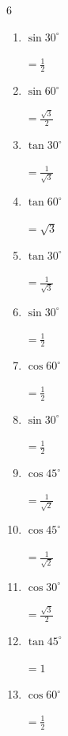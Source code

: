 \begin{multicols}{6}
\begin{enumerate}
  \item $\displaystyle \sin{30^\circ}$

        $\displaystyle =\frac{1}{2}$

  \item $\displaystyle \sin{60^\circ}$

        $\displaystyle =\frac{\sqrt{3}}{2}$

  \item $\displaystyle \tan{30^\circ}$

        $\displaystyle =\frac{1}{\sqrt{3}}$

  \item $\displaystyle \tan{60^\circ}$

        $\displaystyle =\sqrt{3}$

  \item $\displaystyle \tan{30^\circ}$

        $\displaystyle =\frac{1}{\sqrt{3}}$

  \item $\displaystyle \sin{30^\circ}$

        $\displaystyle =\frac{1}{2}$

  \item $\displaystyle \cos{60^\circ}$

        $\displaystyle =\frac{1}{2}$

  \item $\displaystyle \sin{30^\circ}$

        $\displaystyle =\frac{1}{2}$

  \item $\displaystyle \cos{45^\circ}$

        $\displaystyle =\frac{1}{\sqrt{2}}$

\columnbreak %

  \item $\displaystyle \cos{45^\circ}$

        $\displaystyle =\frac{1}{\sqrt{2}}$

  \item $\displaystyle \cos{30^\circ}$

        $\displaystyle =\frac{\sqrt{3}}{2}$

  \item $\displaystyle \tan{45^\circ}$

        $\displaystyle =1$

  \item $\displaystyle \cos{60^\circ}$

        $\displaystyle =\frac{1}{2}$


\end{enumerate}
\end{multicols}
